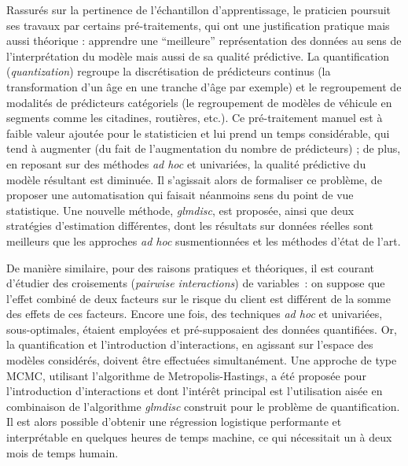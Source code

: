 \medskip

Rassurés sur la pertinence de l'échantillon d'apprentissage, le praticien poursuit ses travaux par certains pré-traitements, qui ont une justification pratique mais aussi théorique : apprendre une ``meilleure'' représentation des données au sens de l'interprétation du modèle mais aussi de sa qualité prédictive. La quantification (\textit{quantization}) regroupe la discrétisation de prédicteurs continus (la transformation d'un âge en une tranche d'âge par exemple) et le regroupement de modalités de prédicteurs catégoriels (le regroupement de modèles de véhicule en segments comme les citadines, routières, etc.). Ce pré-traitement manuel est à faible valeur ajoutée pour le statisticien et lui prend un temps considérable, qui tend à augmenter (du fait de l'augmentation du nombre de prédicteurs) ; de plus, en reposant sur des méthodes \textit{ad hoc} et univariées, la qualité prédictive du modèle résultant est diminuée. Il s'agissait alors de formaliser ce problème, de proposer une automatisation qui faisait néanmoins sens du point de vue statistique. Une nouvelle méthode, \textit{glmdisc}, est proposée, ainsi que deux stratégies d'estimation différentes, dont les résultats sur données réelles sont meilleurs que les approches \textit{ad hoc} susmentionnées et les méthodes d'état de l'art.

\medskip

De manière similaire, pour des raisons pratiques et théoriques, il est courant d'étudier des croisements (\textit{pairwise interactions}) de variables~: on suppose que l'effet combiné de deux facteurs sur le risque du client est différent de la somme des effets de ces facteurs. Encore une fois, des techniques \textit{ad hoc} et univariées, sous-optimales, étaient employées et pré-supposaient des données quantifiées. Or, la quantification et l'introduction d'interactions, en agissant sur l'espace des modèles considérés, doivent être effectuées simultanément. Une approche de type MCMC, utilisant l'algorithme de Metropolis-Hastings, a été proposée pour l'introduction d'interactions et dont l'intérêt principal est l'utilisation aisée en combinaison de l'algorithme \textit{glmdisc} construit pour le problème de quantification. Il est alors possible d'obtenir une régression logistique performante et interprétable en quelques heures de temps machine, ce qui nécessitait un à deux mois de temps humain.

\medskip

